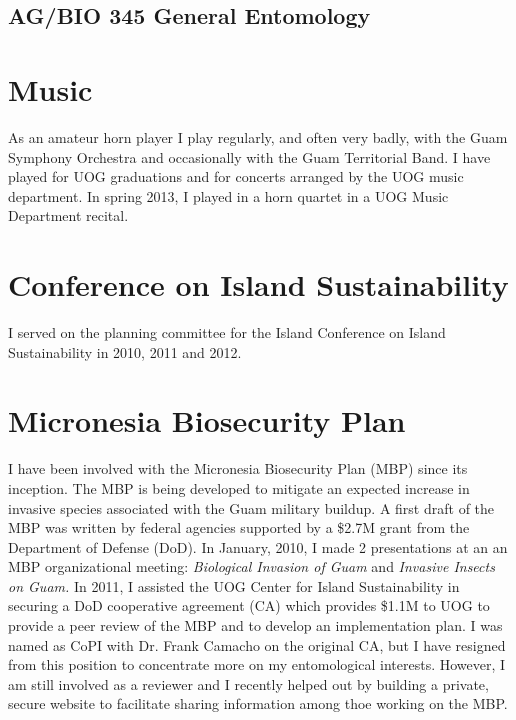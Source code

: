 \documentclass[12pt,oneside,english]{scrbook}
\begin{document}
\subsection{AG/BIO 345 General Entomology}

\subsection{}

\section{Music}

As an amateur horn player I play regularly, and often very badly,
with the Guam Symphony Orchestra and occasionally with the Guam Territorial
Band. I have played for UOG graduations and for concerts arranged
by the UOG music department. In spring 2013, I played in a horn quartet
in a UOG Music Department recital.

\section{Conference on Island Sustainability}

I served on the planning committee for the Island Conference on Island
Sustainability in 2010, 2011 and 2012.

\section{Micronesia Biosecurity Plan}

I have been involved with the Micronesia Biosecurity Plan (MBP) since
its inception. The MBP is being developed to mitigate an expected
increase in invasive species associated with the Guam military buildup.
A first draft of the MBP was written by federal agencies supported
by a \$2.7M grant from the Department of Defense (DoD). In January,
2010, I made 2 presentations at an an MBP organizational meeting:
\emph{Biological Invasion of Guam} and \emph{Invasive Insects on Guam.}
In 2011, I assisted the UOG Center for Island Sustainability in securing
a DoD cooperative agreement (CA) which provides \$1.1M to UOG to provide
a peer review of the MBP and to develop an implementation plan. I
was named as CoPI with Dr. Frank Camacho on the original CA, but I
have resigned from this position to concentrate more on my entomological
interests. However, I am still involved as a reviewer and I recently
helped out by building a private, secure website to facilitate sharing
information among thoe working on the MBP.
\end{document}

